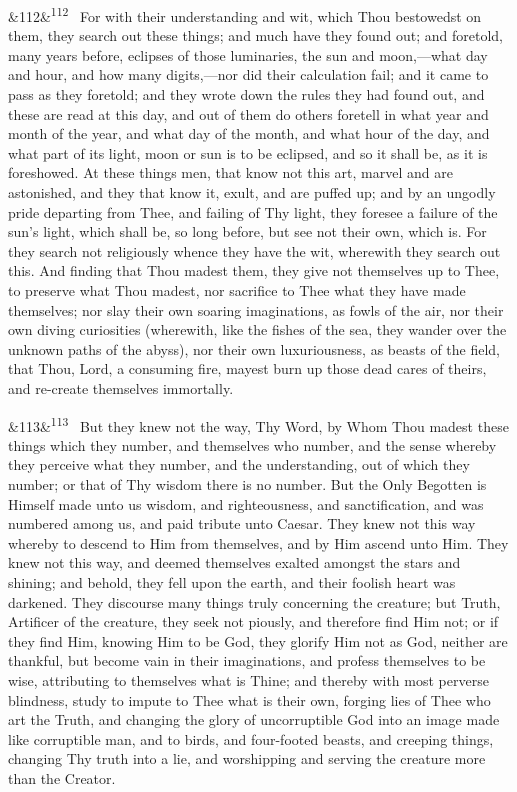 \documentclass[12pt]{article}
\newcommand{\para}[1][]{\par\noindent\ifx&#1&\else\textsuperscript{\footnotesize #1}~\fi}
\begin{document}
\para[112] For with their understanding and wit, which Thou bestowedst on them, they search out these things; and much have they found out; and foretold, many years before, eclipses of those luminaries, the sun and moon,---what day and hour, and how many digits,---nor did their calculation fail; and it came to pass as they foretold; and they wrote down the rules they had found out, and these are read at this day, and out of them do others foretell in what year and month of the year, and what day of the month, and what hour of the day, and what part of its light, moon or sun is to be eclipsed, and so it shall be, as it is foreshowed. At these things men, that know not this art, marvel and are astonished, and they that know it, exult, and are puffed up; and by an ungodly pride departing from Thee, and failing of Thy light, they foresee a failure of the sun's light, which shall be, so long before, but see not their own, which is. For they search not religiously whence they have the wit, wherewith they search out this. And finding that Thou madest them, they give not themselves up to Thee, to preserve what Thou madest, nor sacrifice to Thee what they have made themselves; nor slay their own soaring imaginations, as fowls of the air, nor their own diving curiosities (wherewith, like the fishes of the sea, they wander over the unknown paths of the abyss), nor their own luxuriousness, as beasts of the field, that Thou, Lord, a consuming fire, mayest burn up those dead cares of theirs, and re-create themselves immortally.

\para[113] But they knew not the way, Thy Word, by Whom Thou madest these things which they number, and themselves who number, and the sense whereby they perceive what they number, and the understanding, out of which they number; or that of Thy wisdom there is no number. But the Only Begotten is Himself made unto us wisdom, and righteousness, and sanctification, and was numbered among us, and paid tribute unto Caesar. They knew not this way whereby to descend to Him from themselves, and by Him ascend unto Him. They knew not this way, and deemed themselves exalted amongst the stars and shining; and behold, they fell upon the earth, and their foolish heart was darkened. They discourse many things truly concerning the creature; but Truth, Artificer of the creature, they seek not piously, and therefore find Him not; or if they find Him, knowing Him to be God, they glorify Him not as God, neither are thankful, but become vain in their imaginations, and profess themselves to be wise, attributing to themselves what is Thine; and thereby with most perverse blindness, study to impute to Thee what is their own, forging lies of Thee who art the Truth, and changing the glory of uncorruptible God into an image made like corruptible man, and to birds, and four-footed beasts, and creeping things, changing Thy truth into a lie, and worshipping and serving the creature more than the Creator.
\end{document}
